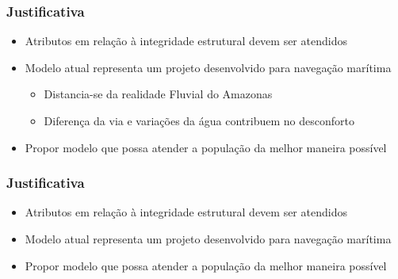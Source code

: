 \documentclass{beamer}
\begin{document}
\begin{frame}
\frametitle{Justificativa}
\begin{itemize}
	\item Atributos em relação à integridade estrutural devem ser atendidos
	\item \alert{Modelo atual representa um projeto desenvolvido para navegação marítima}
	\begin{itemize}
		\item Distancia-se da realidade Fluvial do Amazonas
		\item Diferença da via e variações da água contribuem no desconforto
	\end{itemize}
	\item Propor modelo que possa atender a população da melhor maneira possível  
\end{itemize}
\end{frame}
\begin{frame}
\frametitle{Justificativa}
\begin{itemize}
	\item Atributos em relação à integridade estrutural devem ser atendidos
	\item Modelo atual representa um projeto desenvolvido para navegação marítima
	\item \alert{Propor modelo que possa atender a população da melhor maneira possível}  
\end{itemize}
\end{frame}

\end{document}
